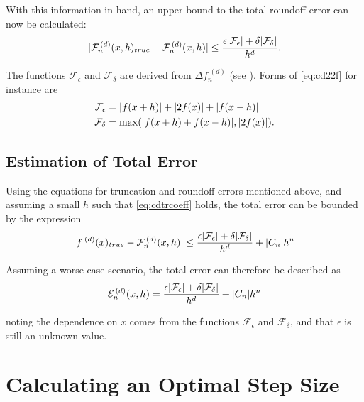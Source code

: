 With this information in hand, an upper bound to the total roundoff error can now be calculated:
\begin{equation}
 \lvert\mathcal{F}_n^{\,(d)}(x,h)_{true}-\mathcal{F}_n^{\,(d)}(x,h)\rvert \leq \frac{\epsilon\lvert\mathcal{F}_\epsilon\rvert+\delta\lvert\mathcal{F}_\delta\rvert}{h^d}.
\end{equation}

The functions $\mathcal{F}_\epsilon$ and $\mathcal{F}_\delta$ are derived from $\Delta f_n^{\;(d)}$ (see ).
Forms of \cref{eq:cd22f} for instance are
\begin{align}
\mathcal{F}_\epsilon &= \lvert f(x+h)\rvert + \lvert2f(x)\rvert + \lvert f(x-h)\rvert \\
\mathcal{F}_\delta &= \max(\lvert f(x+h) + f(x-h)\rvert,\lvert2f(x)\rvert).
\end{align}

\subsection{Estimation of Total Error}\label{sec:cdtoterr}

Using the equations for truncation and roundoff errors mentioned above, and assuming a small $h$ such that \cref{eq:cdtrcoeff} holds, the total error can be bounded by the expression
\begin{equation}
\lvert f^{\;(d)}(x)_{true}-\mathcal{F}_n^{\,(d)}(x,h)\rvert \leq \frac{\epsilon\lvert\mathcal{F}_\epsilon\rvert+\delta\lvert\mathcal{F}_\delta\rvert}{h^d} + \lvert C_n\rvert h^n
\end{equation}

Assuming a worse case scenario, the total error can therefore be described as
\begin{equation}
\mathcal{E}_n^{\,(d)}(x,h) = \frac{\epsilon\lvert\mathcal{F}_\epsilon\rvert+\delta\lvert\mathcal{F}_\delta\rvert}{h^d} + \lvert C_n\rvert h^n\label{eq:cnetot}
\end{equation}

noting the dependence on $x$ comes from the functions $\mathcal{F}_\epsilon$ and $\mathcal{F}_\delta$, and that $\epsilon$ is still an unknown value.

\section[Optimal Step Size]{Calculating an Optimal Step Size}\label{sec:hopt}

